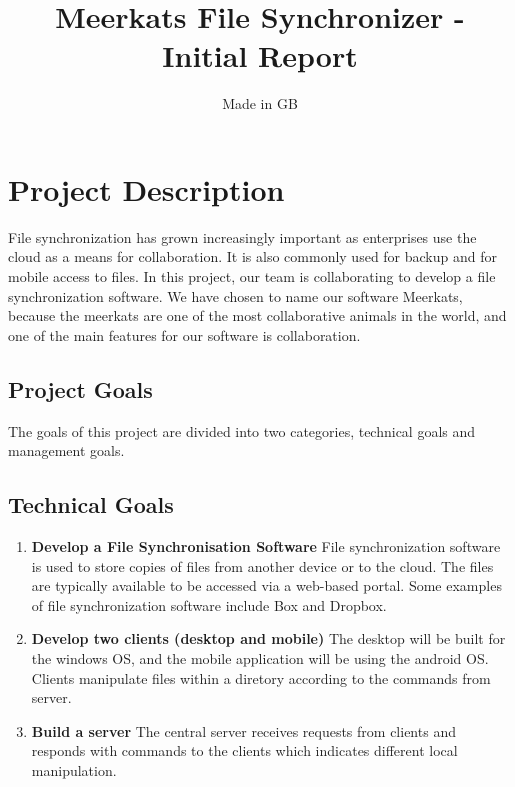 \documentclass{article}
\title{Meerkats File Synchronizer - Initial Report}
\author{Made in GB}
\date{}
\begin{document}
\maketitle{}


\section{Project Description}

File synchronization has grown increasingly important as enterprises use the cloud as a means for collaboration. It is also commonly used for backup and for mobile access to files. In this project, our team is collaborating to develop a file synchronization software. We have chosen to name our software Meerkats, because the meerkats are one of the most collaborative animals in the world, and one of the main features for our software is collaboration.

\subsection{Project Goals}
The goals of this project are divided into two categories, technical goals and management goals.

\subsection{Technical Goals}

\begin{enumerate}
  \item \textbf{Develop a File Synchronisation Software} File synchronization software is used to store copies of files from another device or to the cloud. The files are typically available to be accessed via a web-based portal. Some examples of file synchronization software include Box and Dropbox.
  \item \textbf{Develop two clients (desktop and mobile)} The desktop will be built for the windows OS, and the mobile application will be using the android OS. Clients manipulate files within a diretory according to the commands from server.
  \item \textbf{Build a server} The central server receives requests from clients and responds with commands to  the clients which indicates different local manipulation.

\end{enumerate}
\end{document}
